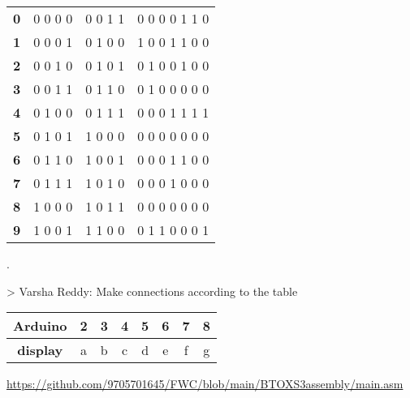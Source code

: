 \documentclass{article}
\begin{document}
\begin{tableofcontents}
\begin{tabular}{|c||c||c||c|}
\hline
\textbf{0} & {0  0  0 0} & {0  0  1 1} & {0 0 0 0 1 1 0}\\
\textbf{1} & {0  0  0 1} & {0  1  0 0} & {1 0 0 1 1 0 0}\\
\textbf{2} & {0  0  1 0} & {0  1  0 1} & {0 1 0 0 1 0 0}\\
\textbf{3} & {0  0  1 1} & {0  1  1 0} & {0 1 0 0 0 0 0}\\
\textbf{4} & {0  1  0 0} & {0  1  1 1} & {0 0 0 1 1 1 1}\\
\textbf{5} & {0  1  0 1} & {1  0  0 0} & {0 0 0 0 0 0 0}\\
\textbf{6} & {0  1  1 0} & {1  0  0 1} & {0 0 0 1 1 0 0}\\
\textbf{7} & {0  1  1 1} & {1  0  1 0} & {0 0 0 1 0 0 0}\\
\textbf{8} & {1  0  0 0} & {1  0  1 1} & {0 0 0 0 0 0 0}\\
\textbf{9} & {1  0  0 1} & {1  1  0 0} & {0 1 1 0 0 0 1}\\
\hline

\end{tabular}
\newline
{}.

> Varsha Reddy:
Make connections according to the table\\
\newline
\begin{tabular}{|c||c||c||c||c||c||c||c|}
\hline
\textbf{Arduino} & 2 & 3 & 4 & 5 & 6 & 7 & 8\\
\hline
\textbf{display} & {a} & {b} & {c} & {d} & {e} & {f} & {g}\\
\hline
\end{tabular}
\newline
\end{tableofcontents}
\newline
\vspace{1cm}
\href{https://github.com/9705701645/FWC/blob/main/BTOXS3assembly/main.asm}{https://github.com/9705701645/FWC/blob/main/BTOXS3assembly/main.asm}
\end{document}
